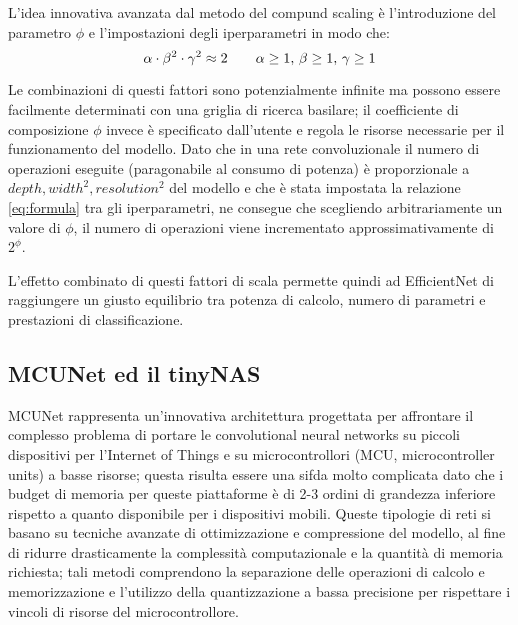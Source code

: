 L'idea innovativa avanzata dal metodo del compund scaling è l'introduzione del parametro $\phi$ e l'impostazioni degli iperparametri in modo che:
\begin{equation}
  \centering
  \alpha \cdot \beta^{2} \cdot \gamma^{2} \approx 2 \qquad \alpha \ge 1, \, \beta \ge 1, \, \gamma \ge 1
  \label{eq:formula}
\end{equation}

Le combinazioni di questi fattori sono potenzialmente infinite ma possono essere facilmente determinati con una griglia di ricerca basilare; il coefficiente di composizione $\phi$ invece è specificato dall'utente e regola le risorse necessarie per il funzionamento del modello. Dato che in una rete convoluzionale il numero di operazioni eseguite (paragonabile al consumo di potenza) è proporzionale a $depth, width^{2}, resolution^{2}$ del modello e che è stata impostata la relazione \ref{eq:formula} tra gli iperparametri, ne consegue che scegliendo arbitrariamente un valore di $\phi$, il numero di operazioni viene incrementato approssimativamente di $2^{\phi}$.

L'effetto combinato di questi fattori di scala permette quindi ad EfficientNet di raggiungere un giusto equilibrio tra potenza di calcolo, numero di parametri e prestazioni di classificazione.

\subsection{MCUNet ed il tinyNAS}

MCUNet rappresenta un'innovativa architettura progettata per affrontare il complesso problema di portare le convolutional neural networks su piccoli dispositivi per l'Internet of Things e su microcontrollori (MCU, microcontroller units) a basse risorse; questa risulta essere una sifda molto complicata dato che i budget di memoria per queste piattaforme è di 2-3 ordini di grandezza inferiore rispetto a quanto disponibile per i dispositivi mobili.
Queste tipologie di reti si basano su tecniche avanzate di ottimizzazione e compressione del modello, al fine di ridurre drasticamente la complessità computazionale e la quantità di memoria richiesta; tali metodi comprendono la separazione delle operazioni di calcolo e memorizzazione e l'utilizzo della quantizzazione a bassa precisione per rispettare i vincoli di risorse del microcontrollore.


